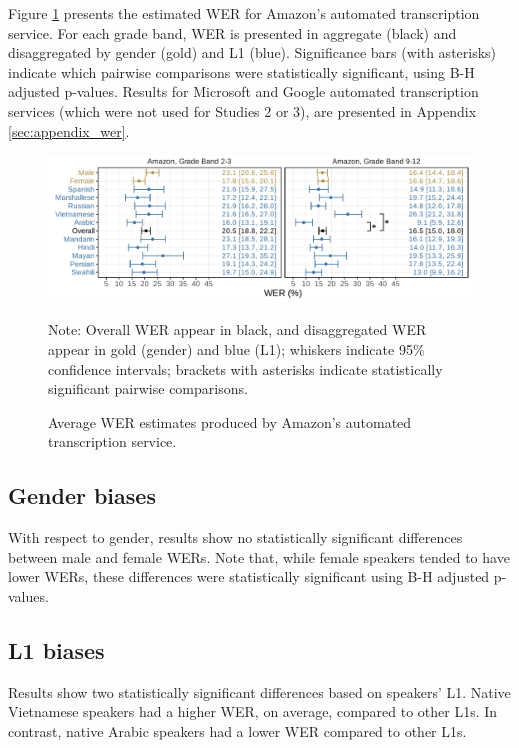\documentclass [PhD] {uclathes}
\begin{document}
Figure \ref{wer_aws} presents the estimated WER for Amazon’s automated transcription service. For each grade band, WER is presented in aggregate (black) and disaggregated by gender (gold) and L1 (blue). Significance bars (with asterisks) indicate which pairwise comparisons were statistically significant, using B-H adjusted p-values. Results for Microsoft and Google automated transcription services (which were not used for Studies 2 or 3), are presented in Appendix \ref{sec:appendix_wer}. 

\begin{figure}[h]
    \centering
    \caption{Average WER estimates produced by Amazon’s automated transcription service.}
    \includegraphics[width=6.5in]{figures/20230513_adj_werPlot_sigBars_aws.pdf}
    \label{wer_aws}
{Note: Overall WER appear in black, and disaggregated WER appear in gold (gender) and blue (L1); whiskers indicate 95\% confidence intervals; brackets with asterisks indicate statistically significant pairwise comparisons. \par}
\end{figure}

\subsection{Gender biases}

With respect to gender, results show no statistically significant differences between male and female WERs. Note that, while female speakers tended to have lower WERs, these differences were statistically significant using B-H adjusted p-values.

\subsection{L1 biases}

Results show two statistically significant differences based on speakers’ L1. Native Vietnamese speakers had a higher WER, on average, compared to other L1s. In contrast, native Arabic speakers had a lower WER compared to other L1s. 
\end{document}
